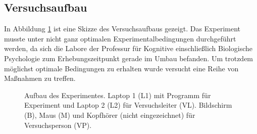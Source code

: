 \documentclass[doc,a4paper,12pt]{apa6}
\begin{document}
\subsection{Versuchsaufbau}

In Abbildung \ref{experiment} ist eine Skizze des Versuchsaufbaus gezeigt. Das Experiment musste unter nicht ganz optimalen Experimentalbedingungen durchgeführt werden, da sich die Labore der Professur für Kognitive einschließlich Biologische Psychologie zum Erhebungszeitpunkt gerade im Umbau befanden. Um trotzdem möglichst optimale Bedingungen zu erhalten wurde versucht eine Reihe von Maßnahmen zu treffen.

\newpage

\begin{figure}
  \centering
  \begin{minipage}{.55\textwidth}
    \setlength{\fboxsep}{.05\textwidth}
    \vspace{10pt}
    \caption{Aufbau des Experimentes. Laptop 1 (L1) mit Programm für Experiment und Laptop 2 (L2) für Versuchsleiter (VL). Bildschirm (B), Maus (M) und Kopfhörer (nicht eingezeichnet) für Versuchsperson (VP).}
    \label{experiment}
  \end{minipage}
\end{figure}
\end{document}
